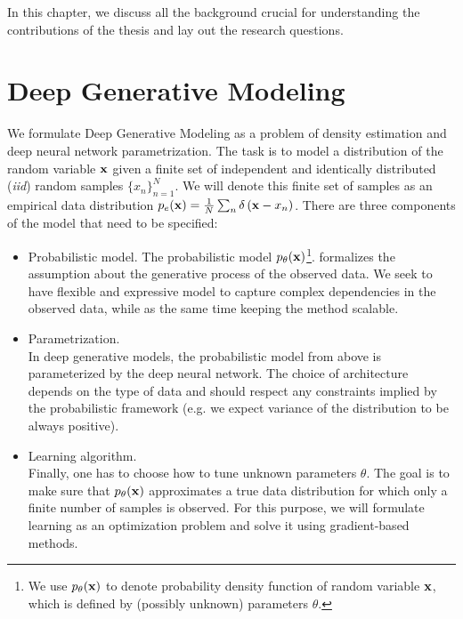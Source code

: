 In this chapter, we discuss all the background crucial for understanding the contributions of the thesis and lay out the research questions. 


\section{Deep Generative Modeling}
We formulate Deep Generative Modeling as a problem of density estimation and deep neural network parametrization. 
The task is to model a distribution of the random variable ${\mathbf{x}}$ given a finite set of independent and identically distributed (\textit{iid}) random samples $\{x_n\}_{n=1}^N$. 
We will denote this finite set of samples as an empirical data distribution $p_e({\mathbf{x}}) = \frac1N \sum_n \delta\left({\mathbf{x}} - x_n\right)$. 
There are three components of the model that need to be specified:
\begin{itemize}
\item Probabilistic model. \newline 
The probabilistic model $p_{\theta}({\mathbf{x}})$\footnote{
	We use $p_{\theta}({\mathbf{x}})$ to denote probability density function of random variable ${\mathbf{x}}$, which is defined by (possibly unknown) parameters $\theta$. 
}.
formalizes the assumption about the generative process of the observed data. 
We seek to have flexible and expressive model to capture complex dependencies in the observed data, while as the same time keeping the method scalable.


\item Parametrization.\\
In deep generative models, the probabilistic model from above is parameterized by the deep neural network. 
The choice of architecture depends on the type of data and should respect any constraints implied by the probabilistic framework (e.g. we expect variance of the distribution to be always positive).

\item Learning algorithm. \\
Finally, one has to choose how to tune unknown parameters $\theta$. The goal is to make sure that $p_{\theta}({\mathbf{x}})$ approximates a true data distribution for which only a finite number of samples is observed. For this purpose, we will formulate learning as an optimization problem and solve it using gradient-based methods. 
\end{itemize}


